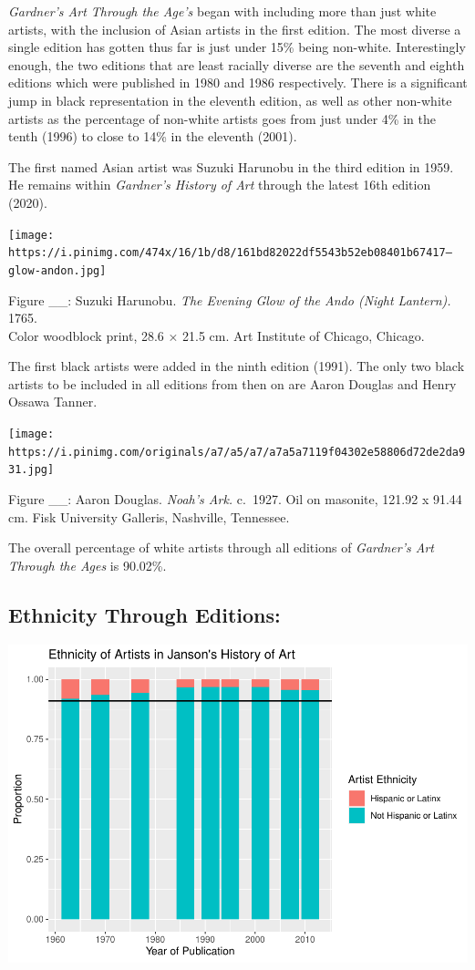 \documentclass[
  letterpaper,
  DIV=11,
  numbers=noendperiod]{scrreprt}
\begin{document}
\emph{Gardner's Art Through the Age's} began with including more than
just white artists, with the inclusion of Asian artists in the first
edition. The most diverse a single edition has gotten thus far is just
under 15\% being non-white. Interestingly enough, the two editions that
are least racially diverse are the seventh and eighth editions which
were published in 1980 and 1986 respectively. There is a significant
jump in black representation in the eleventh edition, as well as other
non-white artists as the percentage of non-white artists goes from just
under 4\% in the tenth (1996) to close to 14\% in the eleventh (2001).

The first named Asian artist was Suzuki Harunobu in the third edition in
1959. He remains within \emph{Gardner's History of Art} through the
latest 16th edition (2020).

\texttt{[image: https://i.pinimg.com/474x/16/1b/d8/161bd82022df5543b52eb08401b67417--glow-andon.jpg]}

Figure \_\_: Suzuki Harunobu. \emph{The Evening Glow of the Ando (Night
Lantern).} 1765.\\
Color woodblock print, 28.6 × 21.5 cm. Art Institute of Chicago,
Chicago.

The first black artists were added in the ninth edition (1991). The only
two black artists to be included in all editions from then on are Aaron
Douglas and Henry Ossawa Tanner.

\texttt{[image: https://i.pinimg.com/originals/a7/a5/a7/a7a5a7119f04302e58806d72de2da931.jpg]}

Figure \_\_: Aaron Douglas. \emph{Noah's Ark.} c.~1927. Oil on masonite,
121.92 x 91.44 cm. Fisk University Galleris, Nashville, Tennessee.

The overall percentage of white artists through all editions of
\emph{Gardner's Art Through the Ages} is 90.02\%.

\hypertarget{ethnicity-through-editions}{%
\subsection{\texorpdfstring{\textbf{Ethnicity Through
Editions:}}{Ethnicity Through Editions:}}\label{ethnicity-through-editions}}

\includegraphics{Chapter1/Chapter1_files/figure-pdf/jansonethnicitythroughtime-1.pdf}
\end{document}
